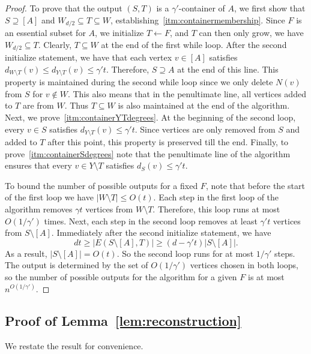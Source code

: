 \documentclass[11pt,letterpaper]{amsart}
\theoremstyle{definition}
\renewcommand{\subset}{\subseteq}
\begin{document}
\begin{proof}
To prove that the output $(S,T)$ is a $\gamma'$-container of $A$, we first show that $S \supseteq [A]$ and $W_{d/2} \subseteq T \subseteq W$, establishing~\ref{itm:containermembership}. 
Since $F$ is an essential subset for $A$, we initialize $T\gets F$, and $T$ can then only grow, we have $W_{d/2}\subset T$. Clearly, $T \subseteq W$ at the end of the first while loop.
After the second initialize statement, we have that each vertex $v \in [A]$ satisfies $d_{W \setminus T}(v) \leq d_{Y \setminus T}(v) \leq \gamma' t$. Therefore, $S \supseteq A$ at the end of this line. This property is maintained during the second while loop since we only delete $N(v)$ from $S$ for $v \not\in W$. This also means that in the penultimate line, all vertices added to $T$ are from $W$. Thus $T \subseteq W$ is also maintained at the end of the algorithm.
Next, we prove~\ref{itm:containerYTdegrees}. 
At the beginning of the second loop, every $v \in S$ satisfies $d_{Y \setminus T}(v)\leq \gamma' t$. Since vertices are only removed from $S$ and added to $T$ after this point, this property is preserved till the end. Finally, to prove~\ref{itm:containerSdegrees} note that the penultimate line of the algorithm ensures that every $v \in Y \setminus T$ satisfies $d_S(v) \leq \gamma' t$. 

To bound the number of possible outputs for a fixed $F$, note that before the start of the first loop we have $|W \setminus T| \leq O(t)$. Each step in the first loop of the algorithm removes $\gamma t$ vertices from $W \setminus T$. 
Therefore, this loop runs at most $O(1/\gamma')$ times. Next, each step in the second loop removes at least $\gamma' t$ vertices from $S \setminus [A]$. Immediately after the second initialize statement, we have
\[
dt\geq |E(S \setminus [A], T)| \geq (d - \gamma' t)|S \setminus [A]|.
\]
As a result, $|S \setminus [A]| = O(t)$. So the second loop runs for at most $1/\gamma'$ steps. The output is determined by the set of $O(1/\gamma')$ vertices chosen in both loops, so the number of possible outputs for the algorithm for a given $F$ is at most $n^{O(1/\gamma')}$.
\end{proof}

\subsection{Proof of Lemma~\texorpdfstring{\ref{lem:reconstruction}}{\ref*{lem:reconstruction}}}

We restate the result for convenience. 
\lemreconstruction*
\end{document}
